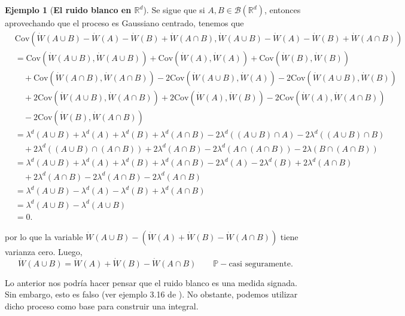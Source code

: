 \documentclass[letterpaper,twoside]{book}
\newcommand{\R}{\mathbb{R}}
\newcommand{\B}{\mathcal{B}}
\renewcommand{\P}{\mathbb{P}}
\newcommand{\W}{\dot{W}}
\newcommand{\1}{\mathds{1}}
\theoremstyle{definition}
\theoremstyle{definition}
\theoremstyle{definition}
\theoremstyle{definition}
\theoremstyle{definition}
\theoremstyle{definition}
\newtheorem{ejem}{Ejemplo}
\theoremstyle{definition}
\begin{document}
\begin{ejem}[\textbf{El ruido blanco en $\R^{d}$}]
Se sigue que si $A,B\in \B(\R^d)$, entonces aprovechando que el proceso es Gaussiano centrado, tenemos que
\begin{align*}
    &\text{Cov}\left(\W(A\cup B)-\W(A)-\W(B)+\W(A\cap B),\W(A\cup B)-\W(A)-\W(B)+\W(A\cap B)\right)\\
    &=\text{Cov}\left(\W(A\cup B),\W(A\cup B)\right)+\text{Cov}\left(\W(A),\W(A)\right)+\text{Cov}\left(\W(B),\W(B)\right)\\
    &\quad +\text{Cov}\left(\W(A\cap B),\W(A\cap B)\right)-2 \text{Cov}\left(\W(A\cup B),\W(A)\right)-2 \text{Cov}\left(\W(A\cup B), \W(B)\right)\\
    &\quad +2 \text{Cov}\left(\W(A\cup B), \W(A\cap B)\right)+2 \text{Cov}\left(\W(A),\W(B)\right)-2 \text{Cov}\left(\W(A),\W(A\cap B)\right)\\
    &\quad -2 \text{Cov}\left(\W(B),\W(A\cap B)\right)\\
    &=\lambda^{d}(A\cup B)+\lambda^{d}(A)+\lambda^{d}(B)+\lambda^{d}(A\cap B)-2\lambda^{d}((A\cup B)\cap A)-2\lambda^{d}((A\cup B)\cap B)\\
    &\quad+2\lambda^{d}((A\cup B)\cap (A\cap B))+2\lambda^{d}(A\cap B)-2\lambda^{d}(A\cap (A\cap B))-2\lambda(B\cap(A\cap B))\\
    &=\lambda^{d}(A\cup B)+\lambda^d(A)+\lambda^{d}(B)+\lambda^{d}(A\cap B)-2\lambda^{d}(A)-2\lambda^{d}(B)+2\lambda^{d}(A\cap B)\\
    &\quad +2\lambda^{d}(A\cap B)-2\lambda^{d}(A\cap B)-2\lambda^{d}(A\cap B)\\
    &=\lambda^{d}(A\cup B)-\lambda^d(A)-\lambda^{d}(B)+\lambda^{d}(A\cap B)\\
    &=\lambda^{d}(A\cup B)-\lambda^{d}(A\cup B)\\
    &=0.
\end{align*}

por lo que la variable $\W(A\cup B)-(\W(A)+\W(B)-\W(A\cap B))$ tiene varianza cero. Luego,
\begin{equation}\label{Wdotmeasure}    
    \W(A\cup B)=\W(A)+\W(B)-\W(A\cap B) \qquad \P-\text{casi seguramente}.
\end{equation}


\end{ejem}
Lo anterior nos podría hacer pensar que el ruido blanco es una medida signada. Sin embargo, esto es falso (ver ejemplo 3.16 de \cite{Khoshnevisan2009}). No obstante, podemos utilizar dicho proceso como base para construir una integral.
\end{document}

